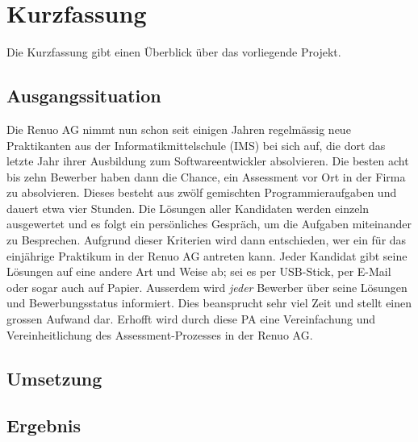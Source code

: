 \chapter{Kurzfassung}

Die Kurzfassung gibt einen Überblick über das vorliegende Projekt.

\section{Ausgangssituation}

Die Renuo AG nimmt nun schon seit einigen Jahren regelmässig neue Praktikanten aus der Informatikmittelschule (IMS) bei sich auf, die
dort das letzte Jahr ihrer Ausbildung zum Softwareentwickler absolvieren. Die besten acht bis zehn Bewerber haben dann die Chance, ein Assessment
vor Ort in der Firma zu absolvieren. Dieses besteht aus zwölf gemischten Programmieraufgaben und dauert etwa vier Stunden.
Die Lösungen aller Kandidaten werden einzeln ausgewertet und es folgt ein persönliches Gespräch, um die Aufgaben miteinander zu Besprechen.
Aufgrund dieser Kriterien wird dann entschieden, wer ein für das einjährige Praktikum in der Renuo AG antreten kann.
Jeder Kandidat gibt seine Lösungen auf eine andere Art und Weise ab; sei es per USB-Stick, per E-Mail oder sogar auch auf Papier.
Ausserdem wird \emph{jeder} Bewerber über seine Lösungen und Bewerbungsstatus informiert.
Dies beansprucht sehr viel Zeit und stellt einen grossen Aufwand dar. Erhofft wird durch diese PA eine Vereinfachung und Vereinheitlichung des Assessment-Prozesses in der Renuo AG.

\section{Umsetzung}

\section{Ergebnis}
